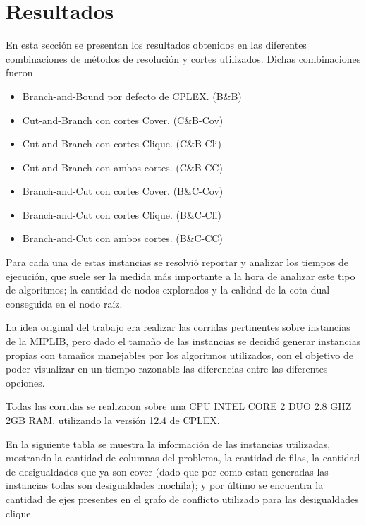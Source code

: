 \section{Resultados}


En esta secci\'on se presentan los resultados obtenidos en las diferentes combinaciones de m\'etodos de resoluci\'on y cortes utilizados. Dichas combinaciones fueron

\begin{itemize}
\item Branch-and-Bound por defecto de CPLEX. (B\&B)
\item Cut-and-Branch con cortes Cover. (C\&B-Cov)
\item Cut-and-Branch con cortes Clique. (C\&B-Cli)
\item Cut-and-Branch con ambos cortes. (C\&B-CC)
\item Branch-and-Cut con cortes Cover. (B\&C-Cov)
\item Branch-and-Cut con cortes Clique. (B\&C-Cli)
\item Branch-and-Cut con ambos cortes. (B\&C-CC)
\end{itemize}

Para cada una de estas instancias se resolvi\'o reportar y analizar los tiempos de ejecuci\'on, que suele ser la medida m\'as importante a la hora de analizar este tipo de algoritmos; la cantidad de nodos explorados y la calidad de la cota dual conseguida en el nodo ra\'iz.


La idea original del trabajo era realizar las corridas pertinentes sobre instancias de la MIPLIB, pero dado el tama\~no de las instancias se decidi\'o generar instancias propias con tama\~nos manejables por los algoritmos utilizados, con el objetivo de poder visualizar en un tiempo razonable las diferencias entre las diferentes opciones.

Todas las corridas se realizaron sobre una CPU INTEL CORE 2 DUO 2.8 GHZ 2GB RAM, utilizando la versi\'on 12.4 de CPLEX.


En la siguiente tabla se muestra la informaci\'on de las instancias utilizadas, mostrando la cantidad de columnas del problema, la cantidad de filas, la cantidad de desigualdades que ya son cover (dado que por como estan generadas las instancias todas son desigualdades mochila); y por \'ultimo se encuentra la cantidad de ejes presentes en el grafo de conflicto utilizado para las desigualdades clique.


